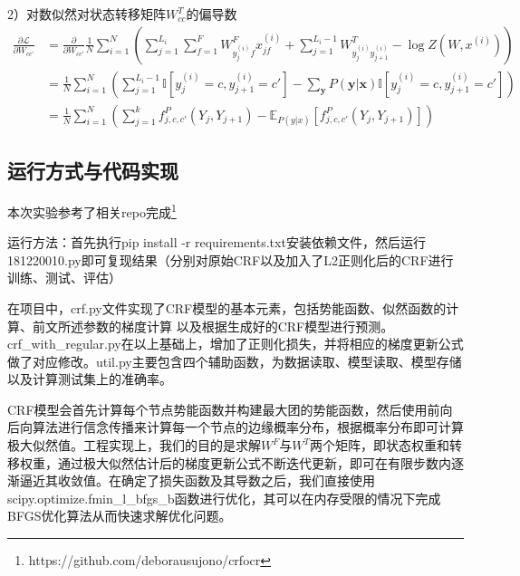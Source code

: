 \documentclass[a4paper,UTF8]{article}
\newcommand{\derivative}[2]{\frac{\partial #1}{\partial #2}}
\newcommand{\suml}[2]{\sum\limits_{#1}^{#2}}
\numberwithin{equation}{section}
\begin{document}
2）对数似然对状态转移矩阵$W_{cc}^{T}$的偏导数
\begin{equation*}
    \begin{aligned}
        \derivative{\mathcal{L}}{W_{cc'}} 
        &= \derivative{}{W_{cc'}} \frac{1}{N} \suml{i=1}{N} \left( \suml{j=1}{L_i} \suml{f=1}{F} W_{y_j^{(i)} f}^F x_{jf}^{(i)} + \suml{j=1}{L_i - 1} W_{y_j^{(i)} y_{j + 1}^{(i)}}^T - \log Z(W, x^{(i)}) \right) \\
        &= \frac{1}{N} \suml{i=1}{N} \left( \suml{j=1}{L_i - 1} \mathbb{I}[y_j^{(i)} = c, y_{j+1}^{(i)} = c'] - \suml{\mathbf{y}}{} P(\mathbf{y} | \mathbf{x}) \mathbb{I}[y_j^{(i)} = c, y_{j+1}^{(i)} = c'] \right) \\
        &= \frac{1}{N}  \sum_{i=1}^{N}\left(  \sum_{j=1}^{k}   f_{j,c,c'}^{P}(Y_{j}, Y_{j+1}) -   \mathbb{E}_{P(y | x)} \left[  f_{j, c,c'}^{P}(Y_{j}, Y_{j+1}) \right]    \right)
    \end{aligned}
\end{equation*}

\subsection{运行方式与代码实现}
本次实验参考了相关repo完成\footnote{https://github.com/deborausujono/crfocr}

运行方法：首先执行pip install -r requirements.txt安装依赖文件，然后运行181220010.py即可复现结果（分别对原始CRF以及加入了L2正则化后的CRF进行训练、测试、评估）

在项目中，crf.py文件实现了CRF模型的基本元素，包括势能函数、似然函数的计算、前文所述参数的梯度计算 以及根据生成好的CRF模型进行预测。crf\_with\_regular.py在以上基础上，增加了正则化损失，并将相应的梯度更新公式做了对应修改。util.py主要包含四个辅助函数，为数据读取、模型读取、模型存储以及计算测试集上的准确率。

CRF模型会首先计算每个节点势能函数并构建最大团的势能函数，然后使用前向后向算法进行信念传播来计算每一个节点的边缘概率分布，根据概率分布即可计算极大似然值。工程实现上，我们的目的是求解$W^F$与$W^T$两个矩阵，即状态权重和转移权重，通过极大似然估计后的梯度更新公式不断迭代更新，即可在有限步数内逐渐逼近其收敛值。在确定了损失函数及其导数之后，我们直接使用scipy.optimize.fmin\_l\_bfgs\_b函数进行优化，其可以在内存受限的情况下完成BFGS优化算法从而快速求解优化问题。
\end{document}
